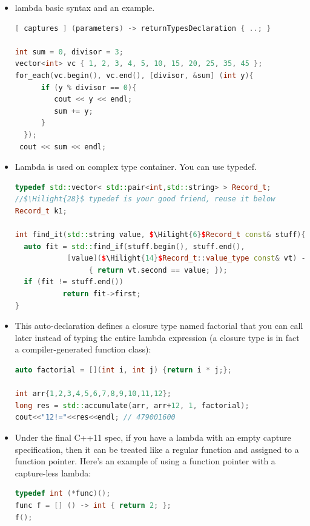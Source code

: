 \documentclass[a4paper,12pt,twoside]{book}
\newcommand{\Hilight}[1]{\makebox[0pt][l]{\color{yellow}\rule[-3pt]{#1em}{11pt}}}
\begin{document}
\begin{itemize}
\item lambda basic syntax and an example.
\begin{lstlisting}[frame=single, language=c++]
[ captures ] (parameters) -> returnTypesDeclaration { ..; }

int sum = 0, divisor = 3;
vector<int> vc { 1, 2, 3, 4, 5, 10, 15, 20, 25, 35, 45 };
for_each(vc.begin(), vc.end(), [divisor, &sum] (int y){
      if (y % divisor == 0){
         cout << y << endl;
         sum += y;
      }
  });
 cout << sum << endl;
\end{lstlisting}

\item Lambda is used on complex type container. You can use typedef.
\begin{lstlisting}[frame=single, language=c++, mathescape=true]
typedef std::vector< std::pair<int,std::string> > Record_t;
//$\Hilight{28}$ typedef is your good friend, reuse it below
Record_t k1;

int find_it(std::string value, $\Hilight{6}$Record_t const& stuff){
  auto fit = std::find_if(stuff.begin(), stuff.end(),
            [value]($\Hilight{14}$Record_t::value_type const& vt) -> bool
                 { return vt.second == value; });
  if (fit != stuff.end())
           return fit->first;
}
\end{lstlisting}

\item This auto-declaration defines a closure type named factorial that you can call later instead of typing the entire lambda expression (a closure type is in fact a compiler-generated function class):
\begin{lstlisting}[frame=single, language=c++]
auto factorial = [](int i, int j) {return i * j;};

int arr{1,2,3,4,5,6,7,8,9,10,11,12};
long res = std::accumulate(arr, arr+12, 1, factorial);
cout<<"12!="<<res<<endl; // 479001600
\end{lstlisting}

\item Under the final C++11 spec, if you have a lambda with an empty capture specification, then it can be treated like a regular function and assigned to a function pointer. Here's an example of using a function pointer with a capture-less lambda:
\begin{lstlisting}[frame=single, language=c++]
typedef int (*func)();
func f = [] () -> int { return 2; };
f();
\end{lstlisting}


\end{itemize}
\end{document}
